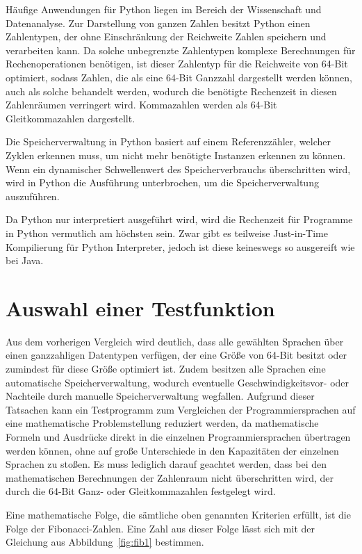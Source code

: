 \documentclass[11pt, parskip=half]{scrartcl}       %
\begin{document}
Häufige Anwendungen für Python liegen im Bereich der Wissenschaft und Datenanalyse.
Zur Darstellung von ganzen Zahlen besitzt Python einen Zahlentypen, der ohne Einschränkung der Reichweite Zahlen speichern und verarbeiten kann.
Da solche unbegrenzte Zahlentypen komplexe Berechnungen für Rechenoperationen benötigen, ist dieser Zahlentyp für die Reichweite von 64-Bit optimiert, sodass Zahlen, die als eine 64-Bit Ganzzahl dargestellt werden können, auch als solche behandelt werden, wodurch die benötigte Rechenzeit in diesen Zahlenräumen verringert wird.\cite{github_python_long}
Kommazahlen werden als 64-Bit Gleitkommazahlen dargestellt.

Die Speicherverwaltung in Python basiert auf einem Referenzzähler, welcher Zyklen erkennen muss, um nicht mehr benötigte Instanzen erkennen zu können.
Wenn ein dynamischer Schwellenwert des Speicherverbrauchs überschritten wird, wird in Python die Ausführung unterbrochen, um die Speicherverwaltung auszuführen.

Da Python nur interpretiert ausgeführt wird, wird die Rechenzeit für Programme in Python vermutlich am höchsten sein.
Zwar gibt es teilweise Just-in-Time Kompilierung für Python Interpreter, jedoch ist diese keineswegs so ausgereift wie bei Java.


\section{Auswahl einer Testfunktion}

Aus dem vorherigen Vergleich wird deutlich, dass alle gewählten Sprachen über einen ganzzahligen Datentypen verfügen, der eine Größe von 64-Bit besitzt oder zumindest für diese Größe optimiert ist.
Zudem besitzen alle Sprachen eine automatische Speicherverwaltung, wodurch eventuelle Geschwindigkeitsvor- oder Nachteile durch manuelle Speicherverwaltung wegfallen.
Aufgrund dieser Tatsachen kann ein Testprogramm zum Vergleichen der Programmiersprachen auf eine mathematische Problemstellung reduziert werden, da mathematische Formeln und Ausdrücke direkt in die einzelnen Programmiersprachen übertragen werden können, ohne auf große Unterschiede in den Kapazitäten der einzelnen Sprachen zu stoßen.
Es muss lediglich darauf geachtet werden, dass bei den mathematischen Berechnungen der Zahlenraum nicht überschritten wird, der durch die 64-Bit Ganz- oder Gleitkommazahlen festgelegt wird.


Eine mathematische Folge, die sämtliche oben genannten Kriterien erfüllt, ist die Folge der Fibonacci-Zahlen.
Eine Zahl aus dieser Folge lässt sich mit der Gleichung aus Abbildung~\ref{fig:fib1} bestimmen.
\end{document}

